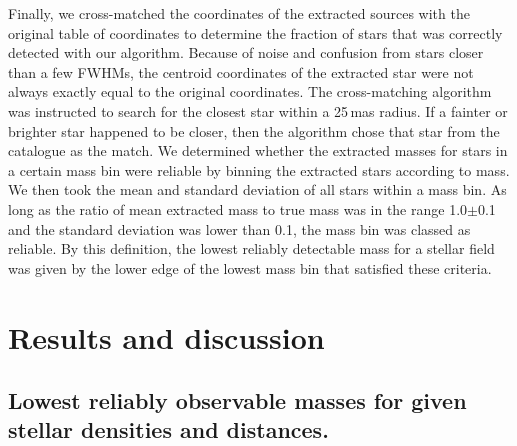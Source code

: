 \documentclass{aa}
\begin{document}
Finally, we cross-matched the coordinates of the extracted sources with the original table of coordinates to determine the fraction of stars that was correctly detected with our algorithm.
Because of noise and confusion from stars closer than a few FWHMs, the centroid coordinates of the extracted star were not always exactly equal to the original coordinates.
The cross-matching algorithm was instructed to search for the closest star within a 25\,mas radius.
If a fainter or brighter star happened to be closer, then the algorithm chose that star from the catalogue as the match.
We determined whether the extracted masses for stars in a certain mass bin were reliable by binning the extracted stars according to mass.
We then took the mean and standard deviation of all stars within a mass bin.
As long as the ratio of mean extracted mass to true mass was in the range 1.0$\pm$0.1 and the standard deviation was lower than 0.1, the mass bin was classed as reliable.
By this definition, the lowest reliably detectable mass for a stellar field was given by the lower edge of the lowest mass bin that satisfied these criteria.





\section{Results and discussion}
\label{sec:results}

\subsection{Lowest reliably observable masses for given stellar densities and distances.}
  \label{subsec:lowest_mass}
\end{document}
